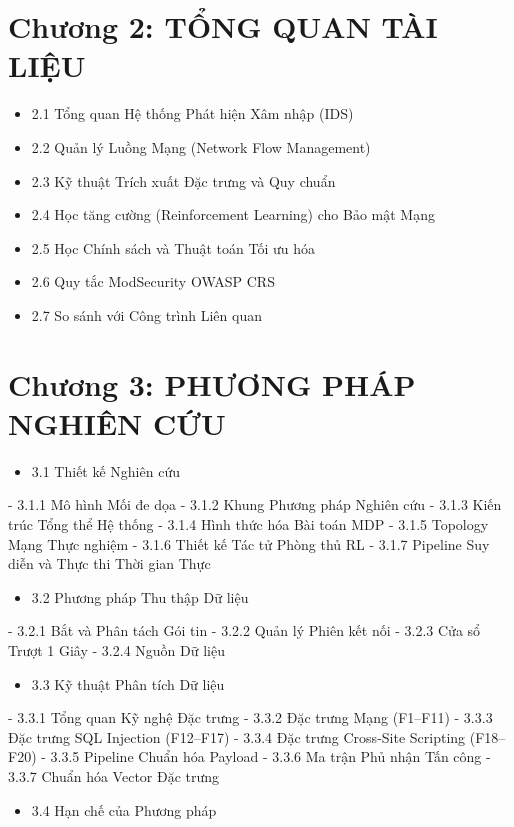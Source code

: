 \documentclass[12pt,a4paper,twoside]{report}
\begin{document}
{\section{Chương 2: TỔNG QUAN TÀI LIỆU}
\begin{itemize}
\item 2.1 Tổng quan Hệ thống Phát hiện Xâm nhập (IDS)
\item 2.2 Quản lý Luồng Mạng (Network Flow Management)
\item 2.3 Kỹ thuật Trích xuất Đặc trưng và Quy chuẩn
\item 2.4 Học tăng cường (Reinforcement Learning) cho Bảo mật Mạng
\item 2.5 Học Chính sách và Thuật toán Tối ưu hóa
\item 2.6 Quy tắc ModSecurity OWASP CRS
\item 2.7 So sánh với Công trình Liên quan
\end{itemize}

\section{Chương 3: PHƯƠNG PHÁP NGHIÊN CỨU}
\begin{itemize}
\item 3.1 Thiết kế Nghiên cứu
\end{itemize}
- 3.1.1 Mô hình Mối đe dọa
- 3.1.2 Khung Phương pháp Nghiên cứu
- 3.1.3 Kiến trúc Tổng thể Hệ thống
- 3.1.4 Hình thức hóa Bài toán MDP
- 3.1.5 Topology Mạng Thực nghiệm
- 3.1.6 Thiết kế Tác tử Phòng thủ RL
- 3.1.7 Pipeline Suy diễn và Thực thi Thời gian Thực
\begin{itemize}
\item 3.2 Phương pháp Thu thập Dữ liệu
\end{itemize}
- 3.2.1 Bắt và Phân tách Gói tin
- 3.2.2 Quản lý Phiên kết nối
- 3.2.3 Cửa sổ Trượt 1 Giây
- 3.2.4 Nguồn Dữ liệu
\begin{itemize}
\item 3.3 Kỹ thuật Phân tích Dữ liệu
\end{itemize}
- 3.3.1 Tổng quan Kỹ nghệ Đặc trưng
- 3.3.2 Đặc trưng Mạng (F1–F11)
- 3.3.3 Đặc trưng SQL Injection (F12–F17)
- 3.3.4 Đặc trưng Cross-Site Scripting (F18–F20)
- 3.3.5 Pipeline Chuẩn hóa Payload
- 3.3.6 Ma trận Phủ nhận Tấn công
- 3.3.7 Chuẩn hóa Vector Đặc trưng
\begin{itemize}
\item 3.4 Hạn chế của Phương pháp
\end{itemize}

}
\end{document}

